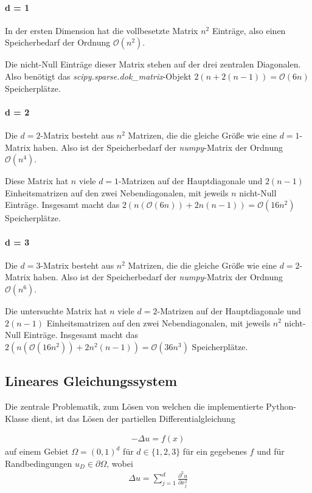 \documentclass[smallheadings]{scrartcl}
\begin{document}
\paragraph{d = 1}
In der ersten Dimension hat die vollbesetzte Matrix $n^2$ Einträge, also einen Speicherbedarf der Ordnung $\mathcal{O}(n^2)$.

Die nicht-Null Einträge dieser Matrix stehen auf der drei zentralen Diagonalen. Also benötigt das \textit{scipy.sparse.dok\_matrix}-Objekt $2(n+2(n-1)) = \mathcal{O}(6n)$ Speicherplätze.

\paragraph{d = 2}
Die $d=2$-Matrix besteht aus $n^2$ Matrizen, die die gleiche Größe wie eine $d=1$-Matrix haben. Also ist der Speicherbedarf der \textit{numpy}-Matrix der Ordnung $\mathcal{O}(n^4)$.

 Diese Matrix hat $n$ viele $d=1$-Matrizen auf der Hauptdiagonale  und $2(n-1)$ Einheitsmatrizen auf den zwei Nebendiagonalen, mit jeweils $n$ nicht-Null Einträge. Insgesamt macht das $2(n(\mathcal{O}(6n))+2n(n-1))=\mathcal{O}(16n^2)$ Speicherplätze.
 
 \paragraph{d = 3}
 Die $d=3$-Matrix besteht aus $n^2$ Matrizen, die die gleiche Größe wie eine $d=2$-Matrix haben. Also ist der Speicherbedarf der \textit{numpy}-Matrix der Ordnung $\mathcal{O}(n^6)$.
 
 Die untersuchte Matrix hat $n$ viele $d=2$-Matrizen auf der Hauptdiagonale  und $2(n-1)$ Einheitsmatrizen auf den zwei Nebendiagonalen, mit jeweils $n^2$ nicht-Null Einträge. Insgesamt macht das $2(n(\mathcal{O}(16n^2))+2n^2(n-1))=\mathcal{O}(36n^3)$ Speicherplätze.

\subsection{Lineares Gleichungssystem}

Die zentrale Problematik, zum Lösen von welchen die implementierte Python-Klasse dient, ist das Lösen der partiellen Differentialgleichung

\begin{align}
-\Delta u=f(x)
\end{align}
auf einem Gebiet $\Omega=(0, 1)^d$ für $d\in \{1, 2, 3\}$ für ein gegebenes $f$ und für Randbedingungen $u_D \in \partial\Omega$, wobei 
\begin{align}
\Delta u=\sum_{j=1}^{d}\frac{\partial^2 u}{\partial x_j^2}
\end{align}
\end{document}
